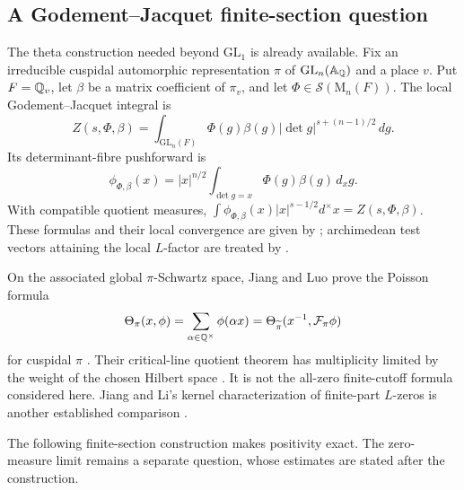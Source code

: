 \subsection{A Godement--Jacquet finite-section question}
The theta construction needed beyond $\mathrm{GL}_1$ is already
available. Fix an irreducible cuspidal automorphic representation
$\pi$ of $\mathrm{GL}_n(\mathbb A_\mathbb Q)$ and a place $v$.
Put $F=\mathbb Q_v$, let $\beta$ be a matrix coefficient of $\pi_v$, and
let $\Phi\in\mathcal S(\mathrm M_n(F))$. The local
Godement--Jacquet integral is
\[
 Z(s,\Phi,\beta)=\int_{\mathrm{GL}_n(F)}\Phi(g)\beta(g)
                  |\det g|^{s+(n-1)/2}\,dg.
\]
Its determinant-fibre pushforward is
\[
 \phi_{\Phi,\beta}(x)=|x|^{n/2}
                  \int_{\det g=x}\Phi(g)\beta(g)\,d_xg.
\]
With compatible quotient measures,
$\int\phi_{\Phi,\beta}(x)|x|^{s-1/2}d^\times x=Z(s,\Phi,\beta)$.
These formulas and their local convergence are given by
\citet[Proposition~3.2 and Definition~3.3, pp.~16--17]{jiangluo2023};
archimedean test vectors attaining the local $L$-factor are treated
by \citet[Theorem~4.22]{humphries2025}.

On the associated global $\pi$-Schwartz space, Jiang and Luo prove
the Poisson formula
\[
 \Theta_\pi(x,\phi)=\sum_{\alpha\in\mathbb Q^\times}\phi(\alpha x)
     =\Theta_{\widetilde\pi}(x^{-1},\mathcal F_\pi\phi)
\]
for cuspidal $\pi$ \citep[Theorem~4.7, p.~27]{jiangluo2023}.
Their critical-line quotient theorem has multiplicity limited by
the weight of the chosen Hilbert space
\citep[Theorem~8.2, p.~50]{jiangluo2023}. It is not the all-zero
finite-cutoff formula considered here. Jiang and Li's kernel
characterization of finite-part $L$-zeros is another established
comparison \citep[Theorems~6.9 and 6.13, pp.~34 and 39]{jiangli2024}.

The following finite-section construction makes positivity exact. The
zero-measure limit remains a separate question, whose estimates are
stated after the construction.


